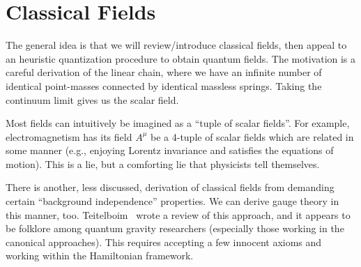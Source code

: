 \chapter{Classical Fields}

\M
The general idea is that we will review/introduce classical fields, then
appeal to an heuristic quantization procedure to obtain quantum fields.
The motivation is a careful derivation of the linear chain, where we
have an infinite number of identical point-masses connected by identical
massless springs. Taking the continuum limit gives us the scalar field.

Most fields can intuitively be imagined as a ``tuple of scalar fields''.
For example, electromagnetism has its field $A^{\mu}$ be a 4-tuple of
scalar fields which are related in some manner (e.g., enjoying Lorentz
invariance and satisfies the equations of motion). This is a lie, but a
comforting lie that physicists tell themselves.

\M
There is another, less discussed, derivation of classical fields from
demanding certain ``background independence'' properties. We can derive
gauge theory in this manner, too. Teitelboim~\cite{Teitelboim:1980hs}
wrote a review of this approach, and it appears to be folklore among
quantum gravity researchers (especially those working in the canonical
approaches). This requires accepting a few innocent axioms and working
within the Hamiltonian framework.






